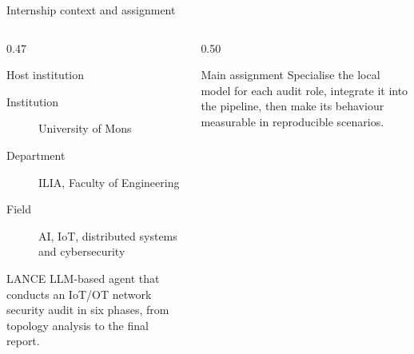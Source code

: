 \documentclass[aspectratio=169,10pt]{beamer}
\begin{document}
\begin{frame}{Internship context and assignment}
  \begin{columns}[T,onlytextwidth]
    \begin{column}{0.47\textwidth}
      \begin{block}{Host institution}
        \begin{description}
          \item[Institution] University of Mons
          \item[Department] ILIA, Faculty of Engineering
          \item[Field] AI, IoT, distributed systems and cybersecurity
        \end{description}
      \end{block}
      \vspace{0.4em}
      \begin{exampleblock}{LANCE}
        LLM-based agent that conducts an IoT/OT network security audit in six
        phases, from topology analysis to the final report.
      \end{exampleblock}
    \end{column}
    \begin{column}{0.50\textwidth}
      \centering
      \vspace{1.2em}
      \begin{alertblock}{Main assignment}
        Specialise the local model for each audit role, integrate it into the
        pipeline, then make its behaviour measurable in reproducible scenarios.
      \end{alertblock}
    \end{column}
  \end{columns}
\end{frame}
\end{document}
